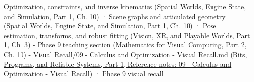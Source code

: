 \href{../05-Spatial-Worlds-Engine-State-and-Simulation-P01/main.pdf\#04-visual-computing-ii-ch029-optimization-constraints-and-inverse-kinematics}{Optimization, constraints, and inverse kinematics (Spatial Worlds, Engine State, and Simulation, Part 1, Ch. 10)} · \href{../05-Spatial-Worlds-Engine-State-and-Simulation-P01/main.pdf\#04-visual-computing-ii-ch029-scene-graphs-and-articulated-geometry}{Scene graphs and articulated geometry (Spatial Worlds, Engine State, and Simulation, Part 1, Ch. 10)} · \href{../07-Vision-XR-and-Playable-Worlds-P01/main.pdf\#04-visual-computing-ii-ch032-pose-estimation-transforms-and-robust-fitting}{Pose estimation, transforms, and robust fitting (Vision, XR, and Playable Worlds, Part 1, Ch. 3)} - \href{../02-Mathematics-for-Visual-Computing-P02/main.pdf\#02-foundations-ii-ch026-optimization-and-inverse-problems}{Phase 9 teaching section (Mathematics for Visual Computing, Part 2, Ch. 10)} - \href{../01-Bits-Programs-and-Reliable-Systems-P01/main.pdf\#appendix-adf48f5dc5c1}{Visual Recall/09 - Calculus and Optimization - Visual Recall.md (Bits, Programs, and Reliable Systems, Part 1, Reference notes: 09 - Calculus and Optimization - Visual Recall)} · Phase 9 visual recall
